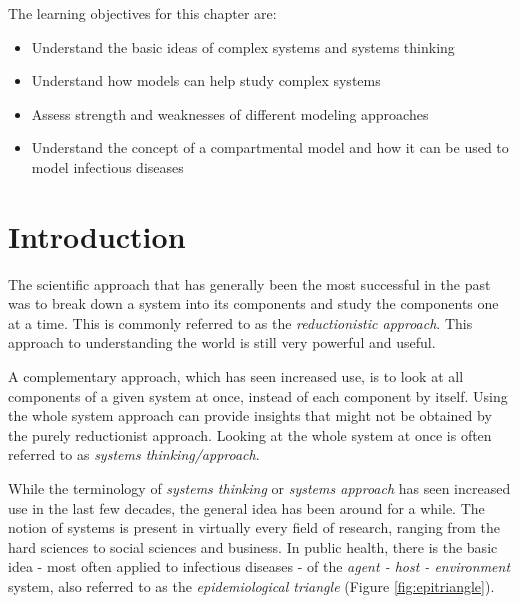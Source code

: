 \documentclass[]{book}
\providecommand{\tightlist}{%
  \setlength{\itemsep}{0pt}\setlength{\parskip}{0pt}}
\theoremstyle{definition}
\theoremstyle{definition}
\theoremstyle{definition}
\theoremstyle{remark}
\begin{document}
The learning objectives for this chapter are:

\begin{itemize}
\tightlist
\item
  Understand the basic ideas of complex systems and systems thinking
\item
  Understand how models can help study complex systems
\item
  Assess strength and weaknesses of different modeling approaches
\item
  Understand the concept of a compartmental model and how it can be used
  to model infectious diseases
\end{itemize}

\section{Introduction}\label{introduction}

The scientific approach that has generally been the most successful in
the past was to break down a system into its components and study the
components one at a time. This is commonly referred to as the
\emph{reductionistic approach}. This approach to understanding the world
is still very powerful and useful.

A complementary approach, which has seen increased use, is to look at
all components of a given system at once, instead of each component by
itself. Using the whole system approach can provide insights that might
not be obtained by the purely reductionist approach. Looking at the
whole system at once is often referred to as \emph{systems
thinking/approach}.

While the terminology of \emph{systems thinking} or \emph{systems
approach} has seen increased use in the last few decades, the general
idea has been around for a while. The notion of systems is present in
virtually every field of research, ranging from the hard sciences to
social sciences and business. In public health, there is the basic idea
- most often applied to infectious diseases - of the \emph{agent - host
- environment} system, also referred to as the \emph{epidemiological
triangle} (Figure \ref{fig:epitriangle}).
\end{document}
